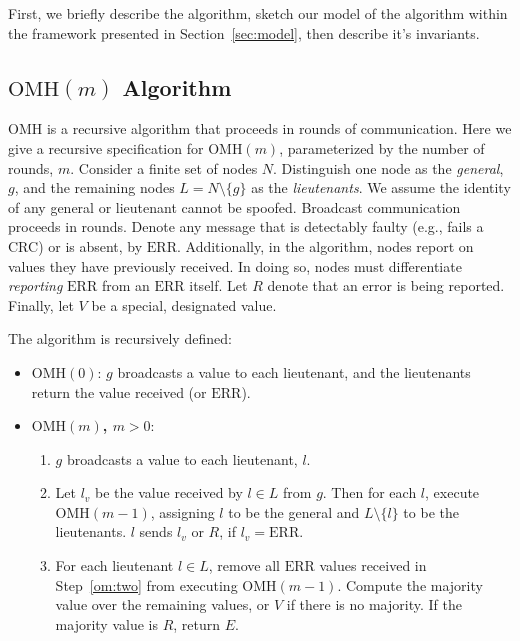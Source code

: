 \documentclass{llncs/llncs}
\newcommand{\OMH}{\ensuremath{\mathrm{OMH}}\xspace}
\newcommand{\ERR}{\ensuremath{\mathrm{ERR}}\xspace}
\begin{document}
First, we briefly describe the algorithm, sketch our model of the algorithm within the framework presented in Section~\ref{sec:model}, then describe it's invariants.


\subsection{$\OMH(m)$ Algorithm}
$\OMH$ is a recursive algorithm that proceeds in rounds of communication. Here we give a recursive specification for $\OMH(m)$, parameterized by the number of rounds, $m$. Consider a finite set of nodes $N$. Distinguish one node as the \emph{general}, $g$, and the remaining nodes $L = N \setminus \{g\}$ as the \emph{lieutenants}. We assume the identity of any general or lieutenant cannot be spoofed. Broadcast communication proceeds in rounds. Denote any message that is detectably faulty (e.g., fails a CRC) or is absent, by $\ERR$. Additionally, in the algorithm, nodes report on values they have previously received. In doing so, nodes must differentiate \emph{reporting} $\ERR$ from an $\ERR$ itself. Let $R$ denote that an error is being reported. Finally, let $V$ be a special, designated value.


The algorithm is recursively defined:

\begin{itemize}
\item {\bf $\OMH(0)$}: $g$ broadcasts a value to each lieutenant, and the lieutenants return the value received (or $\ERR$).
\item {\bf $\OMH(m)$, $m > 0$}:
  \begin{enumerate}
  \item $g$ broadcasts a value to each lieutenant, $l$.
  \item\label{om:two} Let $l_v$ be the value received by $l \in L$ from $g$. Then for each $l$, execute $\OMH(m-1)$, assigning $l$ to be the general and $L \setminus \{l\}$ to be the lieutenants. $l$ sends $l_v$ or $R$, if $l_v = \ERR$.
  \item\label{om:three} For each lieutenant $l \in L$, remove all $\ERR$ values received in Step~\ref{om:two} from executing $\OMH(m-1)$. Compute the majority value over the remaining values, or $V$ if there is no majority. If the majority value is $R$, return $E$.
  \end{enumerate}
\end{itemize}
\end{document}
